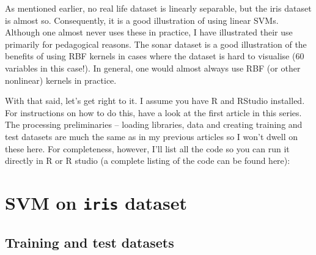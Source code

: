\documentclass[]{book}
\begin{document}
As mentioned earlier, no real life dataset is linearly separable, but the iris dataset is almost so. Consequently, it is a good illustration of using linear SVMs. Although one almost never uses these in practice, I have illustrated their use primarily for pedagogical reasons.
The sonar dataset is a good illustration of the benefits of using RBF kernels in cases where the dataset is hard to visualise (60 variables in this case!). In general, one would almost always use RBF (or other nonlinear) kernels in practice.

With that said, let's get right to it. I assume you have R and RStudio installed. For instructions on how to do this, have a look at the first article in this series. The processing preliminaries -- loading libraries, data and creating training and test datasets are much the same as in my previous articles so I won't dwell on these here. For completeness, however, I'll list all the code so you can run it directly in R or R studio (a complete listing of the code can be found here):

\hypertarget{svm-on-iris-dataset}{%
\section{\texorpdfstring{SVM on \texttt{iris} dataset}{SVM on iris dataset}}\label{svm-on-iris-dataset}}

\hypertarget{training-and-test-datasets}{%
\subsection{Training and test datasets}\label{training-and-test-datasets}}
\end{document}
